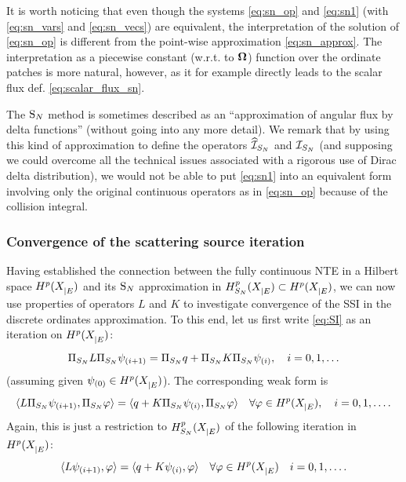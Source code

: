 It is worth noticing that even though the systems \eqref{eq:sn_op}
and \eqref{eq:sn1} (with \eqref{eq:sn_vars} and \eqref{eq:sn_vecs}) are equivalent, the interpretation of the
solution of \eqref{eq:sn_op} is different from the point-wise approximation \eqref{eq:sn_approx}. The interpretation as
a piecewise constant (w.r.t. to $\bomega$) function over the ordinate patches is more natural, however, as it for
example directly leads to the scalar flux def. \eqref{eq:scalar_flux_sn}. 

\begin{remark}
The $\SN$ method is sometimes described as an ``approximation of angular
flux by delta functions'' (without going into any more detail).
We remark that by using this kind of approximation to define the operators $\PihSN$ and $\PiSN$ (and supposing we could
overcome all the technical issues associated with a rigorous use of Dirac delta distribution), we would not be able to
put \eqref{eq:sn1} into an equivalent form involving only the original continuous operators as in \eqref{eq:sn_op}
because of the collision integral. 
\end{remark}

\subsubsection{Convergence of the scattering source iteration} \label{sec:SI}
Having established the connection between the fully continuous NTE in a Hilbert space $\Hp(\XE)$ and its $\SN$
approximation in $\Hp_{S_N}(\XE) \subset \Hp(\XE)$, we can now use properties of operators $L$ and $K$ to
investigate convergence of the SSI in the discrete ordinates approximation. To this end, let us first write
\eqref{eq:SI} as an iteration on $\Hp(\XE)$:
$$ 
	\Projop[S_N] \op{L} \Projop[S_N] \psi_{(i+1)} = \Projop[S_N] q + \Projop[S_N] \op{K} \Projop[S_N] \psi_{(i)},\quad i =
	0,1,\ldots 
$$
(assuming given $\psi_{(0)} \in \Hp(\XE)$). The corresponding weak form is 
$$
	\langle \op{L} \Projop[S_N] \psi_{(i+1)}, \Projop[S_N] \varphi \rangle = \langle q + \op{K}\Projop[S_N] \psi_{(i)},
	\Projop[S_N] \varphi \rangle\quad \forall \varphi\in \Hp(\XE),\quad i = 0,1,\ldots. 
$$ 
Again, this is just a restriction to $\Hp_{S_N}(\XE)$ of the following iteration in $\Hp(\XE)$:
\begin{equation}\label{eq:SIhilbert}
	\langle \op{L} \psi_{(i+1)}, \varphi \rangle = \langle q + \op{K} \psi_{(i)}, \varphi \rangle \quad \forall
	\varphi\in\Hp(\XE) \quad i = 0,1,\ldots.
\end{equation}






